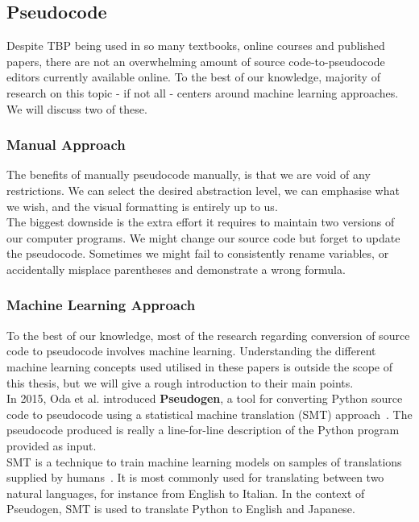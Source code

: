\subsection{Pseudocode}

Despite TBP being used in so many textbooks, online courses and published papers, there are not an overwhelming amount of source code-to-pseudocode editors currently available online. To the best of our knowledge, majority of research on this topic - if not all - centers around machine learning approaches. We will discuss two of these.

\subsubsection{Manual Approach}

The benefits of manually pseudocode manually, is that we are void of any restrictions. We can select the desired abstraction level, we can emphasise what we wish, and the visual formatting is entirely up to us. \\

The biggest downside is the extra effort it requires to maintain two versions of our computer programs. We might change our source code but forget to update the pseudocode. Sometimes we might fail to consistently rename variables, or accidentally misplace parentheses and demonstrate a wrong formula.

\subsubsection{Machine Learning Approach}

To the best of our knowledge, most of the research regarding conversion of source code to pseudocode involves machine learning. Understanding the different machine learning concepts used utilised in these papers is outside the scope of this thesis, but we will give a rough introduction to their main points. \\

In 2015, Oda et al. introduced \textbf{Pseudogen}, a tool for converting Python source code to pseudocode using a statistical machine translation (SMT) approach~\cite{pseudogen}. The pseudocode produced is really a line-for-line description of the Python program provided as input. \\

SMT is a technique to train machine learning models on samples of translations supplied by humans~\cite{whatIsSMT}. It is most commonly used for translating between two natural languages, for instance from English to Italian. In the context of Pseudogen, SMT is used to translate Python to English and Japanese. \\

